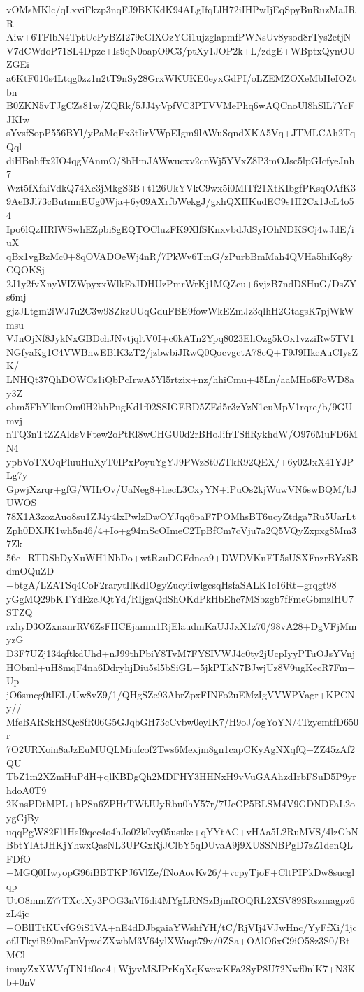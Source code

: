 vOMsMKlc/qLxviFkzp3nqFJ9BKKdK94ALgIfqLlH72iIHPwIjEqSpyBuRuzMaJRR
Aiw+6TFlbN4TptUcPyBZI279eGlXOzYGi1ujzglapmfPWNsUv8ysod8rTys2etjN
V7dCWdoP71SL4Dpzc+Is9qN0oapO9C3/ptXy1JOP2k+L/zdgE+WBptxQynOUZGEi
a6KtF010s4Ltqg0zz1n2tT9nSy28GrxWKUKE0eyxGdPI/oLZEMZOXeMbHeIOZtbn
B0ZKN5vTJgCZs81w/ZQRk/5JJ4yVpfVC3PTVVMePhq6wAQCnoUl8hSlL7YcFJKIw
sYvsfSopP556BYl/yPaMqFx3tIirVWpEIgm9lAWuSqndXKA5Vq+JTMLCAh2TqQql
diHBnhffx2IO4qgVAnmO/8bHmJAWwucxv2cnWj5YVxZ8P3mOJsc5lpGIcfyeJnh7
Wzt5fXfaiVdkQ74Xc3jMkgS3B+t126UkYVkC9wx5i0MlTf21XtKIbgfPKsqOAfK3
9AeBJl73cButmnEUg0Wja+6y09AXrfbWekgJ/gxhQXHKudEC9s1II2Cx1JcL4o54
Ipo6lQzHRlWSwhEZpbi8gEQTOCluzFK9XlfSKnxvbdJdSyIOhNDKSCj4wJdE/iuX
qBx1vgBzMc0+8qOVADOeWj4nR/7PkWv6TmG/zPurbBmMah4QVHa5hiKq8yCQOKSj
2J1y2fvXnyWIZWpyxxWlkFoJDHUzPmrWrKj1MQZcu+6vjzB7ndDSHuG/DsZYs6mj
gjzJLtgm2iWJ7u2C3w9SZkzUUqGduFBE9fowWkEZmJz3qlhH2GtagsK7pjWkWmsu
VJnOjNf8JykNxGBDchJNvtjqltV0I+c0kATn2Ypq8023EhOzg5kOx1vzziRw5TV1
NGfyaKg1C4VWBnwEBlK3zT2/jzbwbiJRwQ0QocvgctA78cQ+T9J9HkcAuCIysZK/
LNHQt37QhDOWCz1iQbPcIrwA5Yl5rtzix+nz/hhiCmu+45Ln/aaMHo6FoWD8ay3Z
ohm5FbYlkmOm0H2hhPugKd1f02SSIGEBD5ZEd5r3zYzN1euMpV1rqre/b/9GUmvj
nTQ3nTtZZAldsVFtew2oPtRl8wCHGU0d2rBHoJifrTSflRykhdW/O976MuFD6MN4
ypbVoTXOqPluuHuXyT0IPxPoyuYgYJ9PWzSt0ZTkR92QEX/+6y02JxX41YJPLg7y
GpwjXzrqr+gfG/WHrOv/UaNeg8+hecL3CxyYN+iPuOs2kjWuwVN6swBQM/bJUWOS
78X1A3zozAuo8su1ZJ4y4lxPwlzDwOYJqq6paF7POMhsBT6ucyZtdga7Ru5UarLt
Zph0DXJK1wh5n46/4+Io+g94mScOImeC2TpBfCm7cVju7a2Q5VQyZxpxg8Mm37Zk
56e+RTDSbDyXuWH1NbDo+wtRzuDGFdnea9+DWDVKnFT5sUSXFnzrBYzSBdmOQuZD
+btgA/LZATSq4CoF2rarytIlKdIOgyZucyiiwlgcsqHsfaSALK1c16Rt+grqgt98
yGgMQ29bKTYdEzcJQtYd/RIjgaQdShOKdPkHbEhc7MSbzgb7fFmeGbmzlHU7STZQ
rxhyD3OZxnanrRV6ZsFHCEjamm1RjElaudmKaUJJxX1z70/98vA28+DgVFjMmyzG
D3F7UZj134qftkdUhd+nJ99thPbiY8TvM7FYSIVWJ4c0ty2jUcpIyyPTuOJsYVnj
HObml+uH8mqF4na6DdryhjDiu5sl5bSiGL+5jkPTkN7BJwjUz8V9ugKecR7Fm+Up
jO6smcg0tlEL/Uw8vZ9/1/QHgSZe93AbrZpxFINFo2uEMzIgVVWPVagr+KPCNy//
MfeBARSkHSQc8fR06G5GJqbGH73cCvbw0eyIK7/H9oJ/ogYoYN/4TzyemtfD650r
7O2URXoin8aJzEuMUQLMiufcof2Tws6Mexjm8gn1capCKyAgNXqfQ+ZZ45zAf2QU
TbZ1m2XZmHuPdH+qlKBDgQh2MDFHY3HHNxH9vVuGAAhzdIrbFSuD5P9yrhdoA0T9
2KnsPDtMPL+hPSn6ZPHrTWfJUyRbu0hY57r/7UeCP5BLSM4V9GDNDFaL2oygGjBy
uqqPgW82Fl1HsI9qcc4o4hJo02k0vy05ustkc+qYYtAC+vHAa5L2RuMVS/4lzGbN
BbtYlAtJHKjYhwxQasNL3UPGxRjJClbY5qDUvaA9j9XUSSNBPgD7zZ1denQLFDfO
+MGQ0HwyopG96iBBTKPJ6VlZe/fNoAovKv26/+vcpyTjoF+CltPIPkDw8sucglqp
UtO8mmZ77TXctXy3POG3nVI6di4MYgLRNSzBjmROQRL2XSV89SRszmagpz6zL4jc
+OBlITtKUvfG9iS1VA+nE4dDJbgaiaYWshfYH/tC/RjVIj4VJwHnc/YyFfXi/1jc
ofJTkyiB90mEmVpwdZXwbM3V64ylXWuqt79v/0ZSa+OAlO6xG9iO58z3S0/BtMCl
imuyZxXWVqTN1t0oe4+WjyvMSJPrKqXqKwewKFa2SyP8U72Nwf0nlK7+N3Kb+0nV
